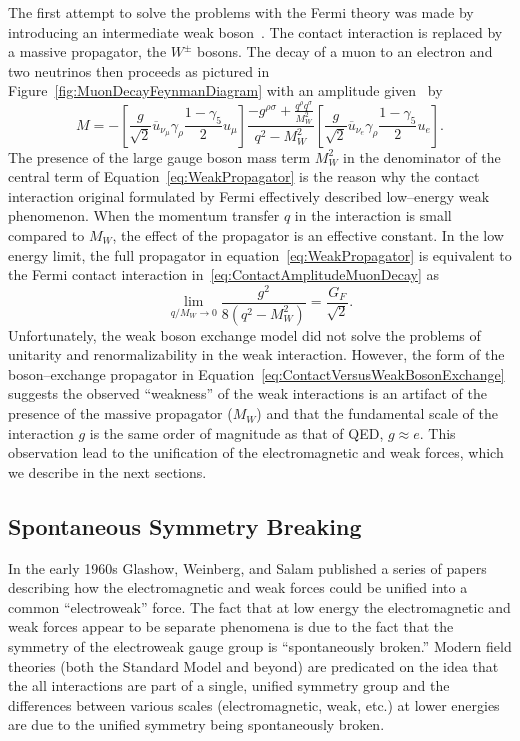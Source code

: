 The first attempt to solve the problems with the Fermi theory was made by
introducing an intermediate weak boson~\cite{Glashow:1961tr}.  The contact
interaction is replaced by a massive propagator, the $W^\pm$ bosons.  The decay
of a muon to an electron and two neutrinos then proceeds as pictured in
Figure~\ref{fig:MuonDecayFeynmanDiagram} with an amplitude
given~\cite{Morii:SMandBSM} by
\begin{equation}
  M = - \left[\frac{g}{\sqrt{2}} \overline u_{\nu_\mu} \gamma_\rho \frac{1 -
  \gamma_5}{2} u_\mu\right] \frac{-g^{\rho\sigma} + \frac{q^\rho
  q^\sigma}{M_W^2}}{q^2 - M_W^2} 
  \left[\frac{g}{\sqrt{2}} \overline u_{\nu_e} \gamma_\rho \frac{1 -
  \gamma_5}{2} u_e\right].
  \label{eq:WeakPropagator}
\end{equation}
The presence of the large gauge boson mass term $M_W^2$ in the denominator of
the central term of Equation~\ref{eq:WeakPropagator} is the reason why the
contact interaction original formulated by Fermi effectively described 
low--energy weak phenomenon.  When the momentum transfer $q$ in the interaction
is small compared to $M_W$, the effect of the propagator is an effective
constant.  In the low energy limit, the full propagator in
equation~\ref{eq:WeakPropagator} is equivalent to the Fermi contact
interaction in~\ref{eq:ContactAmplitudeMuonDecay} as
\begin{equation}
  \lim_{q/M_W \to 0}\frac{g^2}{8(q^2-M^2_W)} = \frac{G_F}{\sqrt{2}}.
  \label{eq:ContactVersusWeakBosonExchange}
\end{equation}
Unfortunately, the weak boson exchange model did not solve the problems of
unitarity and renormalizability in the weak interaction.   However, the form of
the boson--exchange propagator in
Equation~\ref{eq:ContactVersusWeakBosonExchange} suggests the observed
``weakness'' of the weak interactions is an artifact of the presence of the
massive propagator ($M_W$) and that the fundamental scale of the interaction $g$
is the same order of magnitude as that of QED, $g \approx e$.  This observation
lead to the unification of the electromagnetic and weak forces, which we
describe in the next sections.

\subsection{Spontaneous Symmetry Breaking}
\label{sec:SSB}
In the early 1960s Glashow, Weinberg, and Salam published a series of papers
describing how the electromagnetic and weak forces could be unified into a
common ``electroweak'' force.  The fact that at low energy the electromagnetic
and weak forces appear to be separate phenomena is due to the fact that the
symmetry of the electroweak gauge group is ``spontaneously broken.''  Modern
field theories (both the Standard Model and beyond) are predicated on the idea
that the all interactions are part of a single, unified symmetry group and the 
differences between various scales (electromagnetic, weak, etc.) at lower
energies are due to the unified symmetry being spontaneously broken.

